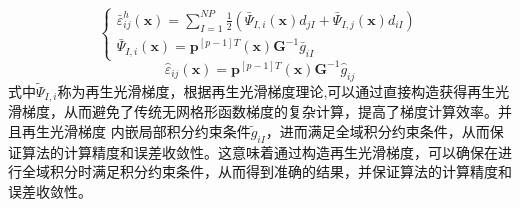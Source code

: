 \begin{equation}
\begin{cases}\label{case2}
    \bar{\varepsilon}^h_{ij}(\pmb{x})=\displaystyle\sum_{I=1}^{N\!P}\frac{1}{2}(\bar{\Psi}_{I,i}(\pmb{x})d_{jI}+\bar{\Psi}_{I,j}(\pmb{x})d_{iI})\\
    \bar{\Psi}_{I,i}(\pmb{x})=\pmb{p}^{[p-1]T}(\pmb{x})\pmb{G}^{-1}\bar{g}_{iI}
\end{cases}
\end{equation}
\begin{equation}\label{case3}
    \hat{\varepsilon}_{ij}(\pmb{x})=\pmb{p}^{[p-1]T}(\pmb{x})\pmb{G}^{-1}\hat{g}_{ij}
\end{equation}
式中$\tilde{\Psi}_{I,i}$称为再生光滑梯度，根据再生光滑梯度理论\cite{},可以通过直接构造获得再生光滑梯度，从而避免了传统无网格形函数梯度的复杂计算，提高了梯度计算效率。并且再生光滑梯度
内嵌局部积分约束条件$\tilde{g}_{iI}$，进而满足全域积分约束条件，从而保证算法的计算精度和误差收敛性。这意味着通过构造再生光滑梯度，可以确保在进行全域积分时满足积分约束条件，从而得到准确的结果，并保证算法的计算精度和误差收敛性。\par
